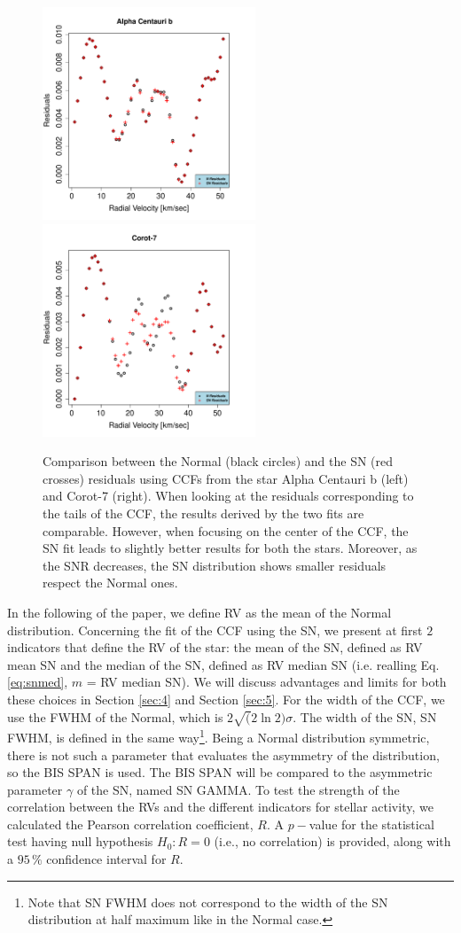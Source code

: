 \documentclass[11pt, oneside]{article}
\begin{document}
\begin{figure}[htbp]
   \centering
\includegraphics[height = 2.5in]{[1]HD128621Residuals.pdf} 
\includegraphics[height = 2.5in]{[1]LRa01_E2Residuals.pdf} 
   \caption{Comparison between the Normal (black circles) and the SN (red crosses) residuals using CCFs from the star Alpha Centauri b (left) and Corot-7 (right). When looking at the residuals corresponding to the tails of the CCF, the results derived by the two fits are comparable. However, when focusing on the center of the CCF, the SN fit leads to slightly better results for both the stars. Moreover, as the SNR decreases, the SN distribution shows smaller residuals respect the Normal ones.}
    \label{fig:Residual.comparison}
\end{figure}
%

In the following of the paper, we define RV as the mean of the Normal distribution. Concerning the fit of the CCF using the SN, we present at first $2$ indicators that define the RV of the star: the mean of the SN, defined as RV mean SN and the median of the SN, defined as RV median SN (i.e. realling Eq.\eqref{eq:snmed}, $m$ = RV median SN). We will discuss advantages and limits for both these choices in Section \ref{sec:4} and Section \ref{sec:5}. For the width of the CCF, we use the FWHM of the Normal, which is $2\sqrt(2\ln2)\sigma$. The width of the SN, SN FWHM, is defined in the same way\footnote{Note that SN FWHM does not correspond to the width of the SN distribution at half maximum like in the Normal case.}. Being a Normal distribution symmetric, there is not such a parameter that evaluates the asymmetry of the distribution, so the BIS SPAN is used. The BIS SPAN will be compared to the asymmetric parameter $\gamma$ of the SN, named SN GAMMA. To test the strength of the correlation between the RVs and the different indicators for stellar activity, we calculated the Pearson correlation coefficient, $R$.
A $p-$value for the statistical test having null hypothesis $H_{0}: R=0$ (i.e., no correlation) is provided, along with a $95\,\%$ confidence interval for $R$.
\end{document}
